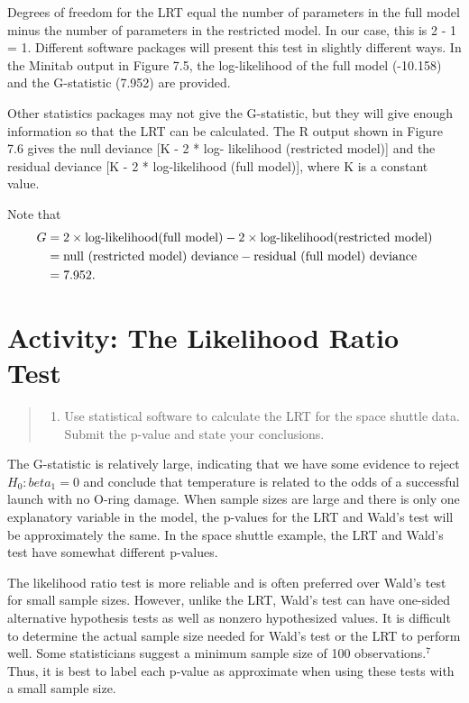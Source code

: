 \documentclass[
]{report}
\providecommand{\tightlist}{%
  \setlength{\itemsep}{0pt}\setlength{\parskip}{0pt}}
\begin{document}
Degrees of freedom for the LRT equal the number of parameters in the full model minus the number of
parameters in the restricted model. In our case, this is 2 - 1 = 1. Different software packages will present
this test in slightly different ways. In the Minitab output in Figure 7.5, the log-likelihood of the full model
(-10.158) and the G-statistic (7.952) are provided.

Other statistics packages may not give the G-statistic, but they will give enough information so that
the LRT can be calculated. The R output shown in Figure 7.6 gives the null deviance {[}K - 2 * log-
likelihood (restricted model){]} and the residual deviance {[}K - 2 * log-likelihood (full model){]}, where
K is a constant value.

Note that
\begin{align}
G &= 2 \times \text{log-likelihood(full model)} - 2 \times \text{log-likelihood(restricted model)} \notag \\
&= \text{null (restricted model) deviance} - \text{residual (full model) deviance} \notag \\
&= 7.952. \notag 
\end{align}

\section*{Activity: The Likelihood Ratio Test}\label{activity-the-likelihood-ratio-test}

\begin{quote}
\begin{enumerate}
\def\labelenumi{\arabic{enumi}.}
\setcounter{enumi}{13}
\tightlist
\item
  Use statistical software to calculate the LRT for the space shuttle data. Submit the p-value and state your conclusions.
\end{enumerate}
\end{quote}

The G-statistic is relatively large, indicating that we have some evidence to reject \(H_0: beta_1 = 0\) and conclude that temperature is related to the odds of a successful launch with no O-ring damage. When sample sizes are large and there is only one explanatory variable in the model, the p-values for the LRT and Wald's test will be approximately the same. In the space shuttle example, the LRT and Wald's test have somewhat different p-values.

The likelihood ratio test is more reliable and is often preferred over Wald's test for small sample sizes. However, unlike the LRT, Wald's test can have one-sided alternative hypothesis tests as well as nonzero hypothesized values. It is difficult to determine the actual sample size needed for Wald's test or the LRT to perform well. Some statisticians suggest a minimum sample size of 100 observations.\(^7\) Thus, it is best to label each p-value as approximate when using these tests with a small sample size.
\end{document}
